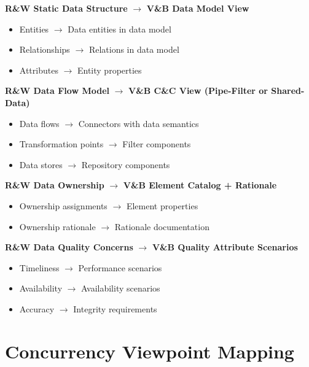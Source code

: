 \documentclass[11pt]{article}
\begin{document}
\begin{mappingbox}

\textbf{R\&W Static Data Structure} $\rightarrow$ \textbf{V\&B Data Model View}
\begin{itemize}[nosep]
    \item Entities $\rightarrow$ Data entities in data model
    \item Relationships $\rightarrow$ Relations in data model
    \item Attributes $\rightarrow$ Entity properties
\end{itemize}

\textbf{R\&W Data Flow Model} $\rightarrow$ \textbf{V\&B C\&C View (Pipe-Filter or Shared-Data)}
\begin{itemize}[nosep]
    \item Data flows $\rightarrow$ Connectors with data semantics
    \item Transformation points $\rightarrow$ Filter components
    \item Data stores $\rightarrow$ Repository components
\end{itemize}

\textbf{R\&W Data Ownership} $\rightarrow$ \textbf{V\&B Element Catalog + Rationale}
\begin{itemize}[nosep]
    \item Ownership assignments $\rightarrow$ Element properties
    \item Ownership rationale $\rightarrow$ Rationale documentation
\end{itemize}

\textbf{R\&W Data Quality Concerns} $\rightarrow$ \textbf{V\&B Quality Attribute Scenarios}
\begin{itemize}[nosep]
    \item Timeliness $\rightarrow$ Performance scenarios
    \item Availability $\rightarrow$ Availability scenarios
    \item Accuracy $\rightarrow$ Integrity requirements
\end{itemize}
\end{mappingbox}

\section{Concurrency Viewpoint Mapping}
\end{document}
